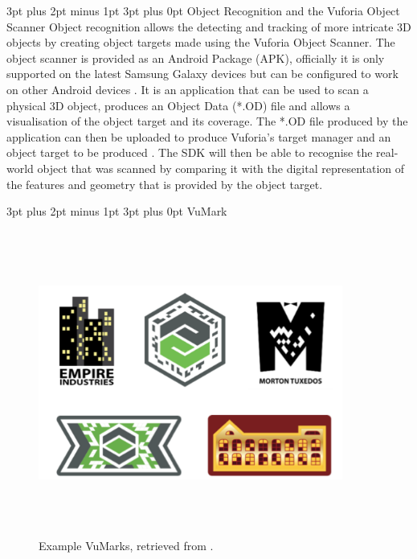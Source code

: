 \documentclass[12pt,a4paper,oneside]{article}
\makeatletter
\renewcommand\paragraph{\@startsection {paragraph}{1}{0mm} %
	                           {3pt plus 2pt minus 1pt} %
	                           {3pt plus 0pt} %
	                           {\normalfont}}
\makeatother
\begin{document}
\paragraph{Object Recognition and the Vuforia Object Scanner}
Object recognition allows the detecting and tracking of more intricate 3D objects by creating object targets made using the Vuforia Object Scanner. The object scanner is provided as an Android Package (APK), officially it is only supported on the latest Samsung Galaxy devices but can be configured to work on other Android devices \cite{vuforiasupportedversions}. It is an application that can be used to scan a physical 3D object, produces an Object Data (*.OD) file and allows a visualisation of the object target and its coverage. The *.OD file produced by the application can then be uploaded to produce Vuforia's target manager and an object target to be produced \cite{vuforiaobjectreco}. The SDK will then be able to recognise the real-world object that was scanned by comparing it with the digital representation of the features and geometry that is provided by the object target.

\paragraph{VuMark}

\begin{figure}[!h]
	\centering
	\includegraphics[width=10cm,height=10cm,keepaspectratio]{images/examplevumarks}
	\caption[Example VuMarks]{Example VuMarks, retrieved from \footnotemark.}
	\label{fig_vumark}
\end{figure}
\end{document}
